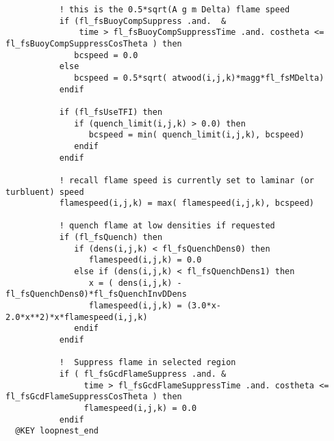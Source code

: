 \documentclass{article}
\begin{document}
\begin{verbatim}
           ! this is the 0.5*sqrt(A g m Delta) flame speed
           if (fl_fsBuoyCompSuppress .and.  &
               time > fl_fsBuoyCompSuppressTime .and. costheta <= fl_fsBuoyCompSuppressCosTheta ) then
              bcspeed = 0.0
           else
              bcspeed = 0.5*sqrt( atwood(i,j,k)*magg*fl_fsMDelta)
           endif

           if (fl_fsUseTFI) then
              if (quench_limit(i,j,k) > 0.0) then
                 bcspeed = min( quench_limit(i,j,k), bcspeed)
              endif
           endif

           ! recall flame speed is currently set to laminar (or turbluent) speed
           flamespeed(i,j,k) = max( flamespeed(i,j,k), bcspeed)

           ! quench flame at low densities if requested
           if (fl_fsQuench) then
              if (dens(i,j,k) < fl_fsQuenchDens0) then
                 flamespeed(i,j,k) = 0.0
              else if (dens(i,j,k) < fl_fsQuenchDens1) then
                 x = ( dens(i,j,k) -fl_fsQuenchDens0)*fl_fsQuenchInvDDens
                 flamespeed(i,j,k) = (3.0*x-2.0*x**2)*x*flamespeed(i,j,k)
              endif
           endif

           !  Suppress flame in selected region
           if ( fl_fsGcdFlameSuppress .and. &
                time > fl_fsGcdFlameSuppressTime .and. costheta <= fl_fsGcdFlameSuppressCosTheta ) then
                flamespeed(i,j,k) = 0.0
           endif
  @KEY loopnest_end
\end{verbatim}
\end{document}
